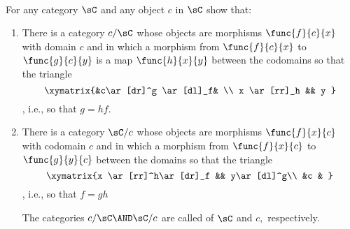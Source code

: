 \documentclass[main.tex]{subfiles}
\begin{document}
\paragraph{}
\begin{exercise}
For any category \(\sC\) and any object \(c\) in \(\sC\) show that:
\begin{enumerate}
	\item There is a category \(c/\sC\) whose objects are morphisms
		\(\func{f}{c}{x}\) with domain \(c\) and in which a morphism from
		\(\func{f}{c}{x}\) to \(\func{g}{c}{y}\) is a map \(\func{h}{x}{y}\)
		between the codomains so that the triangle \[ \xymatrix{&c\ar[dr]^g
		\ar[dl]_f& \\ x \ar[rr]_h && y } \] , i.e., so that
		\(g=hf.\)

	\item There is a category \(\sC/c\) whose objects are morphisms
		\(\func{f}{x}{c}\) with codomain \(c\) and in which a morphism from
		\(\func{f}{x}{c}\) to \( \func{g}{y}{c} \) between the domains so that
		the triangle \[ \xymatrix{x \ar[rr]^h\ar[dr]_f && y\ar[dl]^g\\ &c & } \]
		, i.e., so that \(f=gh\)

		The categories \(c/\sC\AND\sC/c\) are called  of
		\(\sC\)  and  \(c,\) respectively.
\end{enumerate}
\end{exercise}
\end{document}
